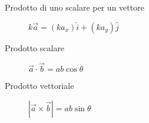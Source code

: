 \documentclass[a4paper,11pt,italian]{article}
\begin{document}
\begin{description}
 
  
  \item[Prodotto di uno scalare per un vettore] $ k \vec{a} = (k a_x)\hat{i} + (k a_y)\hat{j} $
  
  \item[Prodotto scalare]$ \vec{a} \cdot \vec{b} = ab\cos\theta $

  
  \item[Prodotto vettoriale]$ | \vec{a} \times \vec{b} | = ab\sin\theta $
%
%   
\end{description}
\end{document}
